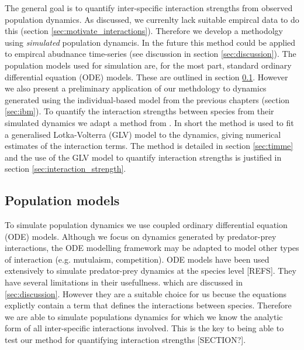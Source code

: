The general goal is to quantify inter-specific interaction strengths from observed population dynamics. As discussed, we currenlty lack suitable empircal data to do this (section \ref{sec:motivate_interactions}). Therefore we develop a methodolgy using \emph{simulated} population dynamcis. In the future this method could be applied to empircal abudnance time-series (see discussion in section \ref{sec:discussion}). The population models used for simulation are, for the most part, standard ordinary differential equation (ODE) models. These are outlined in section \ref{sec:models}. However we also present a preliminary application of our methdology to dynamics generated using the individual-based model from the previous chapters (section \ref{sec:ibm}). To quantify the interaction strengths between species from their simulated dynamics we adapt a method from \cite{shandilya2011inferring}. In short the method is used to fit a generalised Lotka-Volterra (GLV) model to the dynamics, giving numerical estimates of the interaction terms. The method is detailed in section \ref{sec:timme} and the use of the GLV model to quantify interaction strengths is justified in section \ref{sec:interaction_strength}. %


\subsection{Population models}
\label{sec:models}


To simulate population dynamics we use coupled ordinary differential equation (ODE) models. Although we focus on dynamics generated by predator-prey interactions, the ODE modelling framework may be adapted to model other types of interaction (e.g. mutulaism, competition). ODE models have been used extensively to simulate predator-prey dynamics at the species level [REFS]. They have several limitations in their usefullness. which are discussed in \ref{sec:discussion}. However they are a suitable choice for us becuse the equations explictly contain a term that defines the interactions between species. Therefore we are able to simulate populations dynamics for which we know the analytic form of all inter-specific interactions involved. This is the key to being able to test our method for quantifying interaction strengths [SECTION?].   

